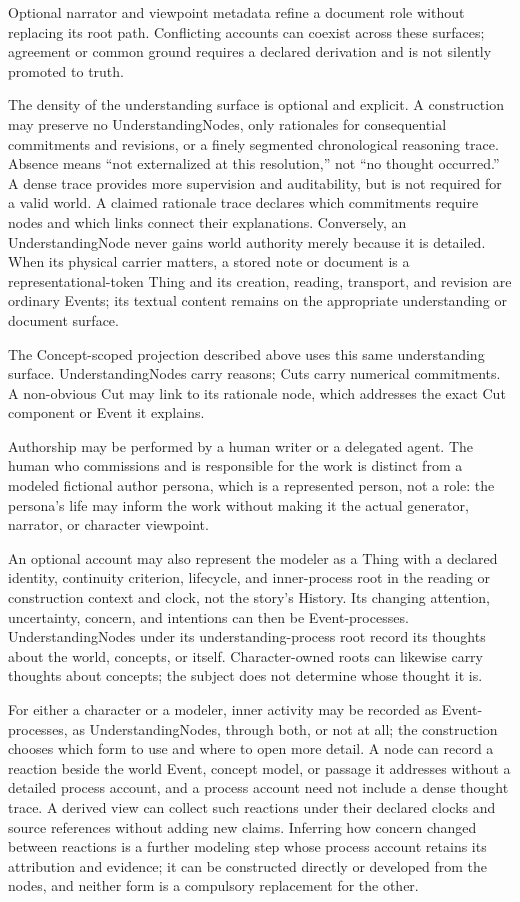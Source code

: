 \documentclass[11pt,a4paper]{article}
\begin{document}
Optional narrator and viewpoint metadata refine a document role without
replacing its root path. Conflicting accounts can coexist across these
surfaces; agreement or common ground requires a declared derivation and is not
silently promoted to truth.

The density of the understanding surface is optional and explicit. A
construction may preserve no UnderstandingNodes, only rationales for consequential commitments and
revisions, or a finely segmented chronological reasoning trace. Absence means
``not externalized at this resolution,'' not ``no thought occurred.'' A dense
trace provides more supervision and auditability, but is not required for a
valid world. A claimed rationale trace declares which commitments require
nodes and which links connect their explanations. Conversely, an UnderstandingNode never gains world authority
merely because it is detailed. When its physical carrier matters, a stored note
or document is a representational-token Thing and its creation, reading,
transport, and revision are ordinary Events; its textual content remains on the
appropriate understanding or document surface.

The Concept-scoped projection described above uses this same understanding
surface. UnderstandingNodes carry reasons; Cuts carry numerical commitments.
A non-obvious Cut may link to its rationale node, which addresses the exact
Cut component or Event it explains.

Authorship may be performed by a human writer or a delegated agent. The human
who commissions and is responsible for the work is distinct from a modeled
fictional author persona, which is a represented person, not a role: the
persona's life may inform the work without making it the actual generator,
narrator, or character viewpoint.

An optional account may also represent the modeler as a Thing
with a declared identity, continuity criterion, lifecycle, and inner-process
root in the reading or construction context and clock, not the story's History.
Its changing attention, uncertainty, concern, and intentions can then be Event-processes.
UnderstandingNodes under its understanding-process root record its thoughts
about the world, concepts, or itself. Character-owned roots can likewise carry
thoughts about concepts; the subject does not determine whose thought it is.

For either a character or a modeler, inner activity may be recorded as
Event-processes, as UnderstandingNodes, through both, or not at all; the
construction chooses which form to use and where to open more detail. A node
can record a reaction beside the world Event, concept model, or passage it
addresses without a detailed process account, and a process account need not
include a dense thought trace. A derived view can collect such reactions under
their declared clocks and source references without adding new claims.
Inferring how concern changed between reactions is a further modeling step whose
process account retains its attribution and evidence; it can be constructed
directly or developed from the nodes, and neither form is a compulsory
replacement for the other.
\end{document}
